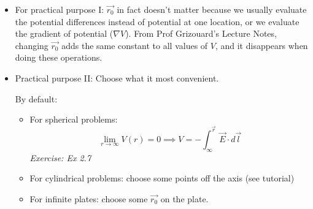 \documentclass[12pt,a4paper,twoside]{article}
\begin{document}
    \begin{itemize}
        \item For practical purpose I: $\overrightarrow{r_0}$ in fact doesn't matter because we usually evaluate the potential differences instead of potential at one location, or we evaluate the gradient of potential ($\nabla V$).
        From Prof Grizouard's Lecture Notes, changing $\overrightarrow{r_0}$ adds the same constant to all values of $V$, and it disappears when doing these operations.
        
        \item Practical purpose II: Choose what it most convenient.
        
        By default:
        \begin{itemize}
            \item For spherical problems:
            \[\lim_{r\to\infty}V(r)=0\implies V=-\int_{\infty}^{\overrightarrow{r}}\overrightarrow{E}\cdot d\overrightarrow{l}\]
                \textit{Exercise: Ex 2.7}
            \item For cylindrical problems: choose some points off the axis (see tutorial)
            \item For infinite plates: choose some $\overrightarrow{r_0}$ on the plate.
        \end{itemize}
    
    \end{itemize}
\end{document}
